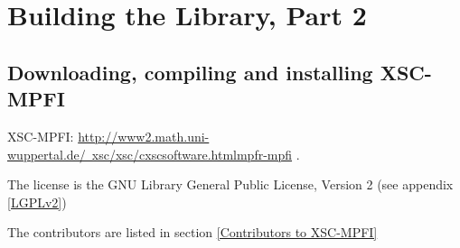 %
%
%
%
%
%
%
%
%
%
%
%
%
%
%
%
%
%
%
%
%
%
%
%
%
%
%
%
%



\newpage
\section{Building the Library, Part 2}



\subsection{Downloading, compiling and installing XSC-MPFI}
XSC-MPFI: \href{http://www2.math.uni-wuppertal.de/~xsc/xsc/cxsc_software.html#mpfr-mpfi}{http://www2.math.uni-wuppertal.de/~xsc/xsc/cxscsoftware.htmlmpfr-mpfi} . 

The license is the GNU Library General Public License, Version 2 (see appendix \ref{LGPLv2})

The contributors are listed in section \ref{Contributors to XSC-MPFI}

